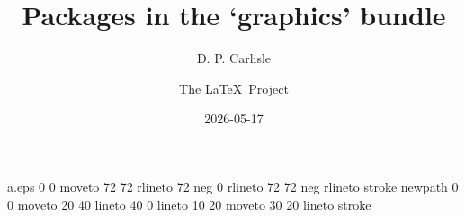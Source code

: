
\begin{filecontents*}{a.eps}
0 0 moveto
72 72 rlineto
72 neg 0 rlineto
72 72 neg rlineto
stroke
newpath
0 0 moveto
20 40 lineto
40 0 lineto
10 20 moveto
30 20 lineto
stroke
\end{filecontents*}
\documentclass{ltxguide}

\usepackage{color,graphicx,shortvrb}



\renewcommand\star{{\ttfamily*}}

\let\package\textsf

\newlength{\gxlen}
\settowidth{\gxlen}{\package{graphicx}: }
\newcommand\gs{\makebox[\gxlen][l]{\package{graphics}:}}
\newcommand\gx{\makebox[\gxlen][l]{\package{graphicx}:}}

\MakeShortVerb{\|}


\title{Packages in the `graphics' bundle}
\author{D. P. Carlisle \and The \LaTeX\ Project}

\date{2026-05-17}

\maketitle

\tableofcontents

\section{Introduction}
This document serves as a user-manual for the packages \package{color},
\package{graphics}, and \package{graphicx}. Further documentation may be
obtained by processing the  source (|dtx|) files of the individual
packages.

